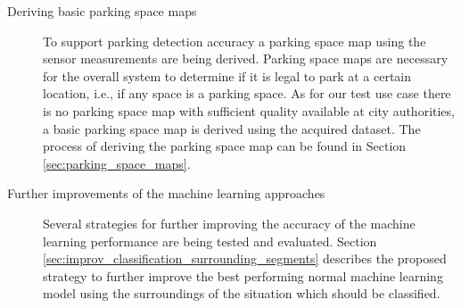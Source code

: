 \begin{description}
\item[Deriving basic parking space maps] To support parking detection accuracy a parking space map using the sensor measurements are being derived. Parking space maps are necessary for the overall system to determine if it is legal to park at a certain location, i.e., if any space is a parking space. As for our test use case there is no parking space map with sufficient quality available at city authorities, a basic parking space map is derived using the acquired dataset. The process of deriving the parking space map can be found in Section \ref{sec:parking_space_maps}.

\item[Further improvements of the machine learning approaches] Several strategies for further improving the accuracy of the machine learning performance are being tested and evaluated. Section \ref{sec:improv_classification_surrounding_segments} describes the proposed strategy to further improve the best performing normal machine learning model using the surroundings of the situation which should be classified.


\end{description}


%


